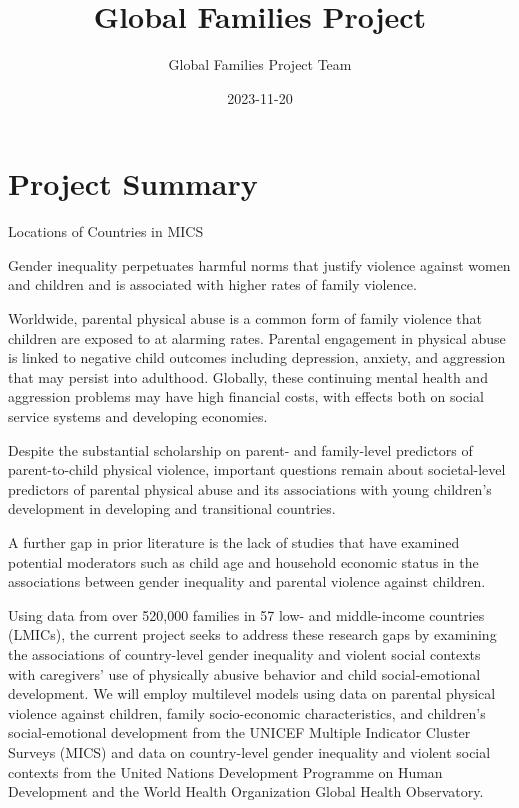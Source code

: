 \documentclass[
  letterpaper,
  DIV=11,
  numbers=noendperiod]{scrreprt}
\title{Global Families Project}
\author{Global Families Project Team}
\date{2023-11-20}
\renewcommand*\contentsname{Table of contents}
\newcommand\contentsname{Table of contents}
\begin{document}
\maketitle
\ifdefined\Shaded\renewenvironment{Shaded}{\begin{tcolorbox}[enhanced, sharp corners, breakable, frame hidden, boxrule=0pt, interior hidden, borderline west={3pt}{0pt}{shadecolor}]}{\end{tcolorbox}}\fi

\renewcommand*\contentsname{Table of contents}
{
\hypersetup{linkcolor=}
\setcounter{tocdepth}{2}
\tableofcontents
}
\listoffigures
\listoftables
{}

\hypertarget{project-summary}{%
\chapter{Project Summary}\label{project-summary}}

Locations of Countries in MICS

Gender inequality perpetuates harmful norms that justify violence
against women and children and is associated with higher rates of family
violence.

Worldwide, parental physical abuse is a common form of family violence
that children are exposed to at alarming rates. Parental engagement in
physical abuse is linked to negative child outcomes including
depression, anxiety, and aggression that may persist into adulthood.
Globally, these continuing mental health and aggression problems may
have high financial costs, with effects both on social service systems
and developing economies.

Despite the substantial scholarship on parent- and family-level
predictors of parent-to-child physical violence, important questions
remain about societal-level predictors of parental physical abuse and
its associations with young children's development in developing and
transitional countries.

A further gap in prior literature is the lack of studies that have
examined potential moderators such as child age and household economic
status in the associations between gender inequality and parental
violence against children.

Using data from over 520,000 families in 57 low- and middle-income
countries (LMICs), the current project seeks to address these research
gaps by examining the associations of country-level gender inequality
and violent social contexts with caregivers' use of physically abusive
behavior and child social-emotional development. We will employ
multilevel models using data on parental physical violence against
children, family socio-economic characteristics, and children's
social-emotional development from the UNICEF Multiple Indicator Cluster
Surveys (MICS) and data on country-level gender inequality and violent
social contexts from the United Nations Development Programme on Human
Development and the World Health Organization Global Health Observatory.
\end{document}
